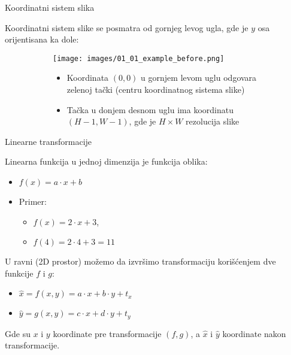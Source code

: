 \documentclass[bookmarks=true,bookmarksopen=true,pdfborder={0 0 0},pdfhighlight={/N},linkbordercolor={.5 .5 .5},implicit=false,unicode,xcolor={table}]{beamer}
\begin{document}
\begin{frame}{Koordinatni sistem slika}

  Koordinatni sistem slike se posmatra od gornjeg levog ugla, gde je $y$ osa orijentisana ka dole:
  \begin{figure}
    \begin{subfigure}{5cm}
      \texttt{[image: images/01\_01\_example\_before.png]}
    \end{subfigure}
    \begin{subfigure}{5cm}
      \begin{itemize}
        \item Koordinata $(0, 0)$ u gornjem levom uglu odgovara zelenoj tački (centru koordinatnog sistema slike)
        \item Tačka u donjem desnom uglu ima koordinatu $(H-1, W-1)$, gde je $H\times W$ rezolucija slike
      \end{itemize}
    \end{subfigure}
  \end{figure}
  
\end{frame}

\begin{frame}{Linearne transformacije}

  Linearna funkcija u jednoj dimenzija je funkcija oblika: 
  \begin{itemize}
    \item $f(x) = a\cdot x + b$
    \item Primer: 
      \begin{itemize}
        \item $f(x) = 2\cdot x + 3$, 
        \item $f(4) = 2\cdot 4 + 3 = 11$
      \end{itemize}
  \end{itemize}
  U ravni (2D prostor) možemo da izvršimo transformaciju korišćenjem dve funkcije $f$ i $g$:
  \begin{itemize}
    \item $\hat{x} = f(x, y) = a\cdot x + b\cdot y + t_{x}$
    \item $\hat{y} = g(x, y) = c\cdot x + d\cdot y + t_{y}$
  \end{itemize}
  Gde su $x$ i $y$ koordinate pre transformacije $(f, g)$, a $\hat{x}$ i $\hat{y}$ koordinate nakon transformacije.

\end{frame}
\end{document}
